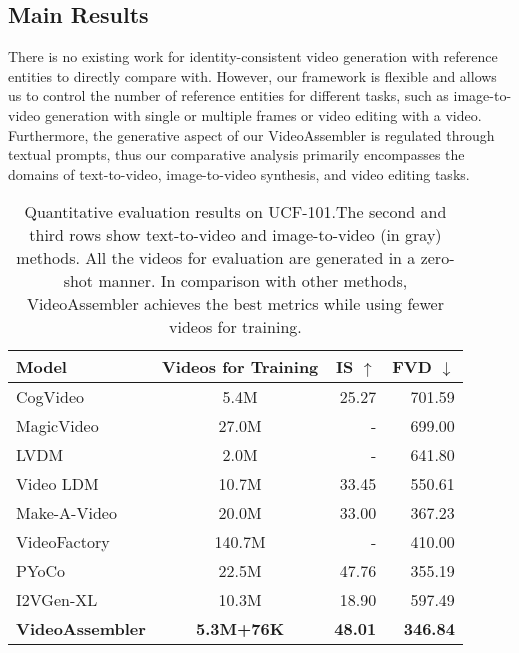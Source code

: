 \subsection{Main Results}

There is no existing work for identity-consistent video generation with reference entities to directly compare with. However, our framework is flexible and allows us to control the number of reference entities for different tasks, such as image-to-video generation with single or multiple frames or video editing with a video. Furthermore, the generative aspect of our VideoAssembler is regulated through textual prompts, thus our comparative analysis primarily encompasses the domains of text-to-video, image-to-video synthesis, and video editing tasks.

\begin{table}[ht]
    \setlength{\tabcolsep}{1.2mm}
    \centering
    \begin{tabular}{lcrr}
       \toprule
       Model & Videos for Training & IS $\uparrow$ & FVD $\downarrow$ \\
       \midrule
       CogVideo~\citep{hong2023cogvideo} & 5.4M & 25.27 & 701.59 \\
       MagicVideo~\citep{zhou2022magicvideo} & 27.0M & - & 699.00 \\
       LVDM~\citep{he2022lvdm} & 2.0M & - & 641.80 \\
       Video LDM~\citep{blattmann2023align} & 10.7M & 33.45 & 550.61 \\
       Make-A-Video~\citep{singer2022make} & 20.0M & 33.00 & 367.23 \\
       VideoFactory~\citep{wang2023videofactory} & 140.7M & - & 410.00 \\
       PYoCo~\cite{ge2023preserve}  & 22.5M & 47.76 & 355.19 \\
       \midrule
       \rowcolor{gray!20}
       \rowcolor{gray!20}
       I2VGen-XL~\cite{zhang2023i2vgen-xl} & 10.3M & 18.90 & 597.49 \\
       \midrule
       \textbf{VideoAssembler} & \textbf{5.3M+76K} & \textbf{48.01} & \textbf{346.84} \\
       \bottomrule
    \end{tabular}
    \caption{
    Quantitative evaluation results on UCF-101.The second and third rows show text-to-video and image-to-video (in gray) methods. All the videos for evaluation are generated in a zero-shot manner. 
    In comparison with other methods, VideoAssembler achieves the best metrics while using fewer videos for training.
    }
    \label{tab:eval_ucf101}
\end{table}

